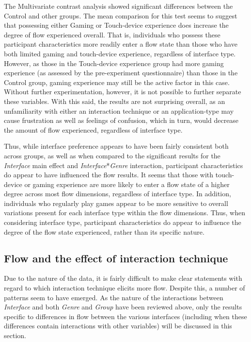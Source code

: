 The Multivariate contrast analysis showed significant differences between the Control and other groups. The mean comparison for this test seems to suggest that possessing either Gaming or Touch-device experience does increase the degree of flow experienced overall. That is, individuals who possess these participant characteristics more readily enter a flow state than those who have both limited gaming and touch-device experience, regardless of interface type. However, as those in the Touch-device experience group had more gaming experience (as assessed by the pre-experiment questionnaire) than those in the Control group, gaming experience may still be the active factor in this case. Without further experimentation, however, it is not possible to further separate these variables. With this said, the results are not surprising overall, as an unfamiliarity with either an interaction technique or an application-type may cause frustration as well as feelings of confusion, which in turn, would decrease the amount of flow experienced, regardless of interface type. 

Thus, while interface preference appears to have been fairly consistent both across groups, as well as when compared to the significant results for the \emph{Interface} main effect and \emph{Interface}*\emph{Genre} interaction, participant characteristics do appear to have influenced the flow results. It seems that those with touch-device or gaming experience are more likely to enter a flow state of a higher degree across most flow dimensions, regardless of interface type. In addition, individuals who regularly play games appear to be more sensitive to overall variations present for each interface type within the flow dimensions. Thus, when considering interface type, participant characteristics do appear to influence the degree of the flow state experienced, rather than its specific nature.

\subsection{Flow and the effect of interaction technique}
Due to the nature of the data, it is fairly difficult to make clear statements with regard to which interaction technique elicits more flow. Despite this, a number of patterns seem to have emerged. As the nature of the interactions between \emph{Interface} and both \emph{Genre} and \emph{Group} have been reviewed above, only the results specific to differences in flow between the various interfaces (including when these differences contain interactions with other variables) will be discussed in this section. 

